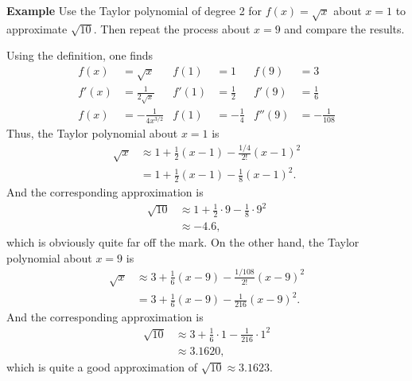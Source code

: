 \documentclass[twoside,openright,titlepage,a4paper]{book}
\begin{document}
\begin{sloppypar}
\textbf{Example} Use the Taylor polynomial of degree 2 for $f(x) = \sqrt{x}$ about $x=1$ to approximate $\sqrt{10}$. Then repeat the process about $x=9$ and compare the results. 
\begin{examplebox}
Using the definition, one finds
\begin{align*}
f(x) &= \sqrt{x} & f(1) &= 1 & f(9) &= 3 \\
f'(x) &= \frac{1}{2\sqrt{x}} & f'(1) &= \frac{1}{2} & f'(9) &= \frac{1}{6} \\
f(x) &= -\frac{1}{4x^{3/2}} & f(1) &= -\frac{1}{4} & f''(9) &= -\frac{1}{108} 
\end{align*}
Thus, the Taylor polynomial about $x=1$ is
\begin{align*}
\sqrt{x} & \approx 1 + \frac{1}{2}(x-1) - \frac{1/4}{2!}(x-1)^2 \\
&= 1 + \frac{1}{2}(x-1) - \frac{1}{8}(x-1)^2.
\end{align*}
And the corresponding approximation is
\begin{align*} 
\sqrt{10} &\approx 1 + \frac{1}{2}\cdot 9 - \frac{1}{8} \cdot 9^2 \\
&\approx -4.6, 
\end{align*}
which is obviously quite far off the mark. On the other hand, the Taylor polynomial about $x=9$ is
\begin{align*}
\sqrt{x} & \approx 3 + \frac{1}{6}(x-9) - \frac{1/{108}}{2!}(x-9)^2 \\
&= 3 + \frac{1}{6}(x-9) - \frac{1}{216}(x-9)^2.
\end{align*}
And the corresponding approximation is
\begin{align*}
\sqrt{10} &\approx 3 + \frac{1}{6}\cdot 1 - \frac{1}{216} \cdot 1^2 \\
&\approx 3.1620, 
\end{align*}
which is quite a good approximation of $\sqrt{10}\approx 3.1623$.
\end{examplebox}

\end{sloppypar}
\end{document}
